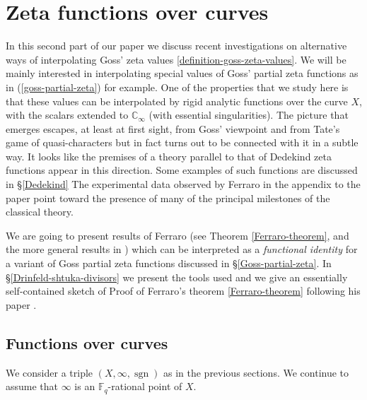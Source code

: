 \documentclass[11pt]{amsart}
\numberwithin{equation}{section}
\newcommand{\FF}{\mathbb{F}}
\newcommand{\CC}{\mathbb{C}}
\newcommand{\sgn}{\operatorname{sgn}}
\begin{document}
\section{Zeta functions over curves}\label{Zeta-functions-curves}

In this second part of our paper we discuss recent investigations on alternative ways of interpolating Goss' zeta values \eqref{definition-goss-zeta-values}. We will be mainly interested in interpolating special values of Goss' partial zeta functions
as in (\ref{goss-partial-zeta}) for example. One of the properties that we study here is that these values can be interpolated by rigid analytic functions over the curve $X$, with the scalars extended to $\CC_\infty$ (with essential singularities). The picture that emerges escapes, at least at first sight, from Goss' viewpoint and from Tate's game of quasi-characters but in fact turns out to be connected with it in a subtle way. It looks like the premises of a theory parallel to that of Dedekind zeta functions appear in this direction. Some examples of such functions are discussed in \S \ref{Dedekind} The experimental data observed by Ferraro in the appendix to the paper point toward the presence of many of the principal milestones of the classical theory.



We are going to present
results of Ferraro (see Theorem \ref{Ferraro-theorem}, and the more general results in \cite{FER1,FER2}) which can be interpreted as a {\em functional identity} for a variant of
Goss partial zeta functions discussed in \S \ref{Goss-partial-zeta}. In \S \ref{Drinfeld-shtuka-divisors} we present the tools used and we give an essentially self-contained sketch of Proof of Ferraro's theorem \ref{Ferraro-theorem} following his paper \cite{FER1}.

\subsection{Functions over curves}\label{partial-zeta-functions}

 We consider a triple $(X,\infty,\sgn)$ as in the previous sections. We continue to assume that $\infty$ is an $\FF_q$-rational point of $X$. 
 
\end{document}
